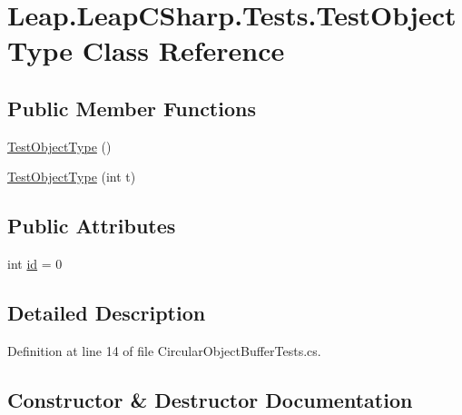 \hypertarget{class_leap_1_1_leap_c_sharp_1_1_tests_1_1_test_object_type}{}\section{Leap.\+Leap\+C\+Sharp.\+Tests.\+Test\+Object\+Type Class Reference}
\label{class_leap_1_1_leap_c_sharp_1_1_tests_1_1_test_object_type}
\subsection*{Public Member Functions}
\begin{DoxyCompactItemize}
\item 
\mbox{\hyperlink{class_leap_1_1_leap_c_sharp_1_1_tests_1_1_test_object_type_ac463ae7d829bf72de0db032823598f29}{Test\+Object\+Type}} ()
\item 
\mbox{\hyperlink{class_leap_1_1_leap_c_sharp_1_1_tests_1_1_test_object_type_acd7961dcf89ccd96fe01d6c3737822fe}{Test\+Object\+Type}} (int t)
\end{DoxyCompactItemize}
\subsection*{Public Attributes}
\begin{DoxyCompactItemize}
\item 
int \mbox{\hyperlink{class_leap_1_1_leap_c_sharp_1_1_tests_1_1_test_object_type_aab9236ab72c05a1cab17cf5e6e85fb62}{id}} = 0
\end{DoxyCompactItemize}


\subsection{Detailed Description}


Definition at line 14 of file Circular\+Object\+Buffer\+Tests.\+cs.



\subsection{Constructor \& Destructor Documentation}
\mbox{\label{class_leap_1_1_leap_c_sharp_1_1_tests_1_1_test_object_type_ac463ae7d829bf72de0db032823598f29}} 
